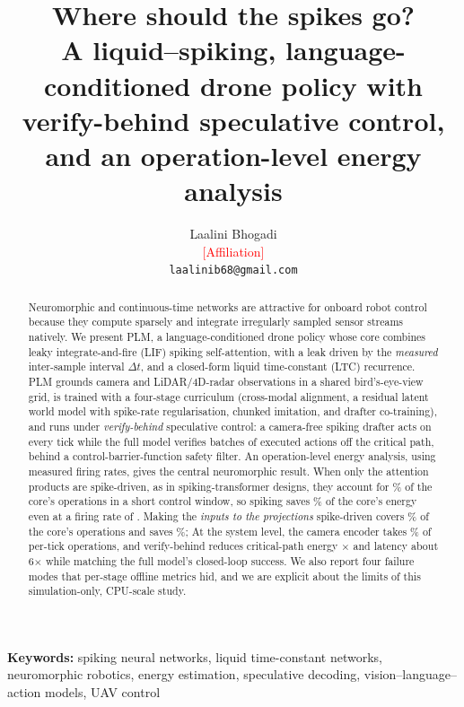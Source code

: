 \documentclass[12pt]{article}
\title{\textbf{Where should the spikes go?}\\[2pt]\large A liquid--spiking, language-conditioned drone policy with verify-behind speculative control, and an operation-level energy analysis}
\author{Laalini Bhogadi\\[2pt]\small \textcolor{red}{[Affiliation]}\\\small \texttt{laalinib68@gmail.com}}
\date{}
\begin{document}
\maketitle

\begin{abstract}
\noindent Neuromorphic and continuous-time networks are attractive for onboard robot control because they compute sparsely and integrate irregularly sampled sensor streams natively. We present PLM, a language-conditioned drone policy whose core combines leaky integrate-and-fire (LIF) spiking self-attention, with a leak driven by the \emph{measured} inter-sample interval $\Delta t$, and a closed-form liquid time-constant (LTC) recurrence. PLM grounds camera and LiDAR/4D-radar observations in a shared bird's-eye-view grid, is trained with a four-stage curriculum (cross-modal alignment, a residual latent world model with spike-rate regularisation, chunked imitation, and drafter co-training), and runs under \emph{verify-behind} speculative control: a camera-free spiking drafter acts on every tick while the full model verifies batches of executed actions off the critical path, behind a control-barrier-function safety filter. An operation-level energy analysis, using measured firing rates, gives the central neuromorphic result. When only the attention products are spike-driven, as in spiking-transformer designs, they account for \nceAttnFracPct\% of the core's operations in a short control window, so spiking saves \nceSavingAsBuiltPct\% of the core's energy even at a firing rate of \nceMeanRate. Making the \emph{inputs to the projections} spike-driven covers \nceSiFracPct\% of the core's operations and saves \nceSiSavingPct\%; \nceSiAccuracySentence{} At the system level, the camera encoder takes \nceVitSharePct\% of per-tick operations, and verify-behind reduces critical-path energy \nceCritRatio$\times$ and latency about 6$\times$ while matching the full model's closed-loop success. We also report four failure modes that per-stage offline metrics hid, and we are explicit about the limits of this simulation-only, CPU-scale study.
\end{abstract}

\noindent\textbf{Keywords:} spiking neural networks, liquid time-constant networks, neuromorphic robotics, energy estimation, speculative decoding, vision--language--action models, UAV control

\end{document}

